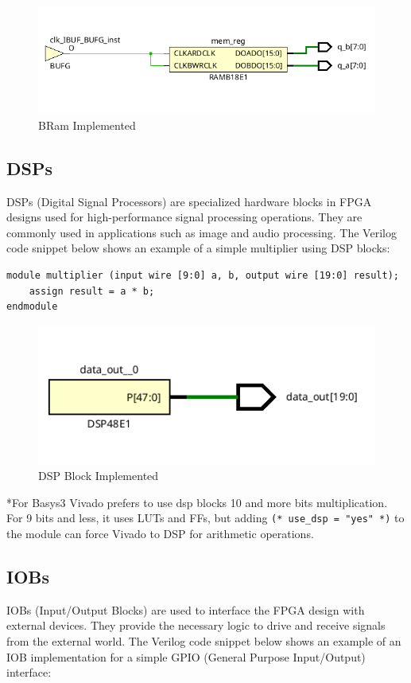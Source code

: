 \documentclass{report}
\begin{document}
\begin{figure}[ht]
    \includegraphics[width=0.6\linewidth]{images/bram.png}
    \centering
    \caption{BRam Implemented}
    \label{fig:bram}
\end{figure}

\subsection{DSPs}
DSPs (Digital Signal Processors) are specialized hardware blocks in FPGA designs used for high-performance signal processing operations. They are commonly used in applications such as image and audio processing. The Verilog code snippet below shows an example of a simple multiplier using DSP blocks:

\begin{verbatim}
module multiplier (input wire [9:0] a, b, output wire [19:0] result);
    assign result = a * b;
endmodule
\end{verbatim}
\begin{figure}[ht]
    \includegraphics[width=0.6\linewidth]{images/dsp.png}
    \centering
    \caption{DSP Block Implemented}
    \label{fig:dsp}
\end{figure}

*For Basys3 Vivado prefers to use dsp blocks 10 and more bits multiplication. For 9 bits and less, it uses LUTs and FFs, but adding \texttt{(* use\_dsp = "yes" *)} to the module can force Vivado to DSP for arithmetic operations.

\subsection{IOBs}
IOBs (Input/Output Blocks) are used to interface the FPGA design with external devices. They provide the necessary logic to drive and receive signals from the external world. The Verilog code snippet below shows an example of an IOB implementation for a simple GPIO (General Purpose Input/Output) interface:
\end{document}
